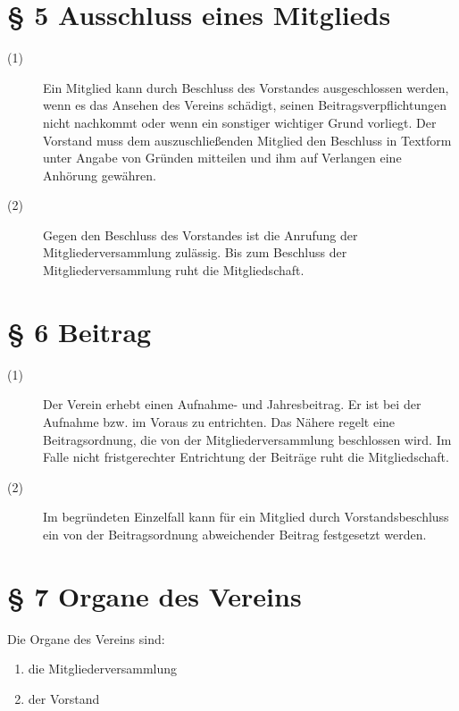 \documentclass[12pt,paper=a4,ngerman]{scrreprt}
\begin{document}
\section{\S{} 5 Ausschluss eines Mitglieds}
\begin{description}
\item[(1)]
Ein Mitglied kann durch Beschluss des Vorstandes ausgeschlossen
werden, wenn es das Ansehen des Vereins schädigt, seinen
Beitragsverpflichtungen nicht nachkommt oder wenn ein sonstiger
wichtiger Grund vorliegt. Der Vorstand muss dem auszuschließenden
Mitglied den Beschluss in Textform unter Angabe von Gründen mitteilen
und ihm auf Verlangen eine Anhörung gewähren.
\item[(2)]
Gegen den Beschluss des Vorstandes ist die Anrufung der
Mitgliederversammlung zulässig. Bis zum Beschluss der
Mitgliederversammlung ruht die Mitgliedschaft.
\end{description}

\section{\S{} 6 Beitrag}
\begin{description}
\item[(1)]
Der Verein erhebt einen Aufnahme- und Jahresbeitrag. Er ist bei der
Aufnahme bzw. im Voraus zu entrichten. Das Nähere regelt eine
Beitragsordnung, die von der Mitgliederversammlung beschlossen wird.
Im Falle nicht fristgerechter Entrichtung der Beiträge ruht die
Mitgliedschaft.
\item[(2)]
Im begründeten Einzelfall kann für ein Mitglied durch
Vorstandsbeschluss ein von der Beitragsordnung abweichender Beitrag
festgesetzt werden.
\end{description}

\section{\S{} 7 Organe des Vereins}
Die Organe des Vereins sind:
\begin{enumerate}
\item
die Mitgliederversammlung
\item
der Vorstand
\end{enumerate}
\end{document}
